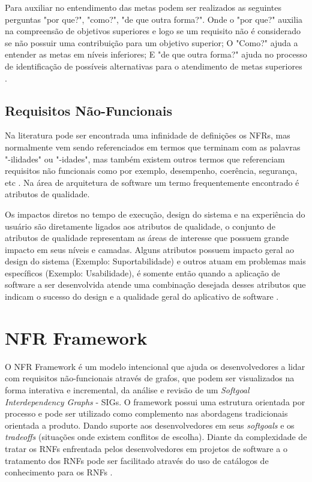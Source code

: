 Para auxiliar no entendimento das metas podem ser realizados as seguintes perguntas "por que?", "como?", "de que outra forma?"\cite{van2001goal}. Onde o "por que?" auxilia na compreensão de objetivos superiores e logo se um requisito não é considerado se não possuir uma contribuição para um objetivo superior; O "Como?" ajuda a entender as metas em níveis inferiores\cite{yu1998goal}; E "de que outra forma?" ajuda no processo de identificação de possíveis alternativas para o atendimento de metas superiores \cite{van2001goal}.  

\subsection{Requisitos Não-Funcionais}

Na literatura pode ser encontrada uma infinidade de definições os NFRs, mas normalmente vem sendo referenciados em termos que terminam com as palavras "-ilidades" ou "-idades", mas também existem outros termos que referenciam requisitos não funcionais como por exemplo, desempenho, coerência, segurança, etc \cite{chung2012non}. Na área de arquitetura de software um termo frequentemente encontrado é atributos de qualidade\cite{barbacci1995quality}.

Os impactos diretos no tempo de execução, design do sistema e na experiência do usuário são diretamente ligados aos atributos de qualidade, o conjunto de atributos de qualidade representam as áreas de interesse que possuem grande impacto em seus níveis e camadas. Alguns atributos possuem impacto geral ao design do sistema (Exemplo: Suportabilidade) e outros atuam em problemas mais específicos (Exemplo: Usabilidade), é somente então quando a aplicação de software a ser desenvolvida atende uma combinação desejada desses atributos que indicam o sucesso do design e a qualidade geral do aplicativo de software \cite{microsoft2009}.

\section{NFR Framework}

O NFR Framework é um modelo intencional que ajuda os desenvolvedores  a  lidar com requisitos não-funcionais através de grafos, que podem ser visualizados na forma interativa e incremental, da análise e revisão de um \textit{Softgoal Interdependency Graphs} - SIGs. O framework possui uma estrutura orientada por processo e pode ser utilizado como complemento nas abordagens tradicionais orientada a produto. Dando suporte aos desenvolvedores em seus \textit{softgoals} e os \textit{tradeoffs} (situações onde existem conflitos de escolha). Diante da complexidade de tratar os RNFs enfrentada pelos desenvolvedores em projetos de software a o tratamento dos RNFs	pode ser facilitado através do uso de catálogos de conhecimento para os RNFs \cite{chung2012non}. 


